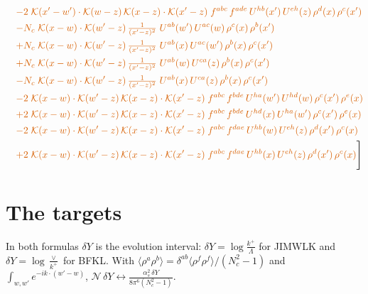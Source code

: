 \documentclass[10pt]{article}
\numberwithin{equation}{section}
\begin{document}
\begin{align}
&\quad{\color{BFK}-2\;\mathcal{K}(x'-w')\cdot\mathcal{K}(w-z)\,\mathcal{K}(x-z)\cdot\mathcal{K}(x'-z)\;f^{abc}\,f^{ade}\,U^{hb}(x')\,U^{eh}(z)\,\rho^{d}(x)\,\rho^{c}(x')}\notag\\
&\quad{\color{BFK}-N_c\;\mathcal{K}(x-w)\cdot\mathcal{K}(w'-z)\,\tfrac{1}{(x'-z)^{2}}\;U^{ab}(w')\,U^{ac}(w)\,\rho^{c}(x)\,\rho^{b}(x')}\notag\\
&\quad{\color{BFK}+N_c\;\mathcal{K}(x-w)\cdot\mathcal{K}(w'-z)\,\tfrac{1}{(x'-z)^{2}}\;U^{ab}(x)\,U^{ac}(w')\,\rho^{b}(x)\,\rho^{c}(x')}\notag\\
&\quad{\color{BFK}+N_c\;\mathcal{K}(x-w)\cdot\mathcal{K}(w'-z)\,\tfrac{1}{(x'-z)^{2}}\;U^{ab}(w)\,U^{ca}(z)\,\rho^{b}(x)\,\rho^{c}(x')}\notag\\
&\quad{\color{BFK}-N_c\;\mathcal{K}(x-w)\cdot\mathcal{K}(w'-z)\,\tfrac{1}{(x'-z)^{2}}\;U^{ab}(x)\,U^{ca}(z)\,\rho^{b}(x)\,\rho^{c}(x')}\notag\\
&\quad{\color{BFK}-2\;\mathcal{K}(x-w)\cdot\mathcal{K}(w'-z)\,\mathcal{K}(x-z)\cdot\mathcal{K}(x'-z)\;f^{abc}\,f^{bde}\,U^{ha}(w')\,U^{hd}(w)\,\rho^{c}(x')\,\rho^{e}(x)}\notag\\
&\quad{\color{BFK}+2\;\mathcal{K}(x-w)\cdot\mathcal{K}(w'-z)\,\mathcal{K}(x-z)\cdot\mathcal{K}(x'-z)\;f^{abc}\,f^{bde}\,U^{hd}(x)\,U^{ha}(w')\,\rho^{c}(x')\,\rho^{e}(x)}\notag\\
&\quad{\color{BFK}-2\;\mathcal{K}(x-w)\cdot\mathcal{K}(w'-z)\,\mathcal{K}(x-z)\cdot\mathcal{K}(x'-z)\;f^{abc}\,f^{dae}\,U^{hb}(w)\,U^{eh}(z)\,\rho^{d}(x')\,\rho^{c}(x)}\notag\\
&\quad{\color{BFK}+2\;\mathcal{K}(x-w)\cdot\mathcal{K}(w'-z)\,\mathcal{K}(x-z)\cdot\mathcal{K}(x'-z)\;f^{abc}\,f^{dae}\,U^{hb}(x)\,U^{eh}(z)\,\rho^{d}(x')\,\rho^{c}(x)}\Bigg]\label{eq:Bsum}
\end{align}



\section{The targets}\label{sec:targets}
In both formulas $\delta Y$ is the evolution interval: $\delta Y=\log\frac{k^+}{\Lambda}$ for JIMWLK and $\delta Y=\log\frac{\vee}{k^+}$ for BFKL. With $\langle\rho^a\rho^b\rangle=\delta^{ab}\langle\rho^f\rho^f\rangle/(N_c^2-1)$ and $\int_{w,w'}e^{-ik\cdot(w'-w)}$, $\mathcal N\,\delta Y\leftrightarrow\frac{\alpha_s^2\,\delta Y}{8\pi^6(N_c^2-1)}$.
\end{document}
